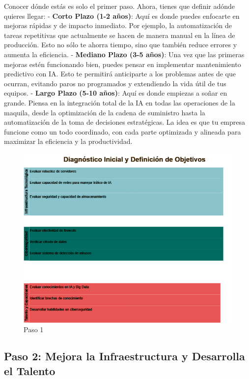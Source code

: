 \documentclass[
  letterpaper,
]{book}
\begin{document}
Conocer dónde estás es solo el primer paso. Ahora, tienes que definir
adónde quieres llegar: - \textbf{Corto Plazo (1-2 años)}: Aquí es donde
puedes enfocarte en mejoras rápidas y de impacto inmediato. Por ejemplo,
la automatización de tareas repetitivas que actualmente se hacen de
manera manual en la línea de producción. Esto no sólo te ahorra tiempo,
sino que también reduce errores y aumenta la eficiencia. -
\textbf{Mediano Plazo (3-5 años)}: Una vez que las primeras mejoras
estén funcionando bien, puedes pensar en implementar mantenimiento
predictivo con IA. Esto te permitirá anticiparte a los problemas antes
de que ocurran, evitando paros no programados y extendiendo la vida útil
de tus equipos. - \textbf{Largo Plazo (5-10 años)}: Aquí es donde
empiezas a soñar en grande. Piensa en la integración total de la IA en
todas las operaciones de la maquila, desde la optimización de la cadena
de suministro hasta la automatización de la toma de decisiones
estratégicas. La idea es que tu empresa funcione como un todo
coordinado, con cada parte optimizada y alineada para maximizar la
eficiencia y la productividad.

\begin{figure}[H]

{\centering \includegraphics{Img/paso1.png}

}

\caption{Paso 1}

\end{figure}%

\subsection{Paso 2: Mejora la Infraestructura y Desarrolla el
Talento}\label{paso-2-mejora-la-infraestructura-y-desarrolla-el-talento}
\end{document}
